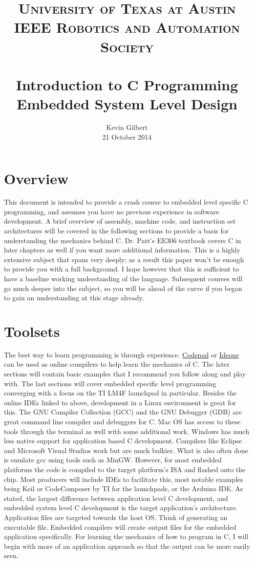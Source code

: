 \documentclass[paper=a4, fontsize=11pt]{scrartcl}
\title{
	\usefont{OT1}{bch}{b}{n}
	\normalfont \normalsize \textsc{University of Texas at Austin\\IEEE Robotics and Automation Society} \\ [25pt]
	\horrule{0.5pt} \\[0.4cm]
	\huge Introduction to C Programming \\ 
		\vskip 0.1in
		\large Embedded System Level Design
	\horrule{2pt} \\[0.5cm]
}
\author{
	\normalfont 			\normalsize
        Kevin Gilbert\\[-3pt]		\normalsize
	21 October 2014
}
\date{}
\numberwithin{equation}{section}		%
\numberwithin{figure}{section}			%
\numberwithin{table}{section}			%
\begin{document}
\maketitle
\section{Overview}
This document is intended to provide a crash course to embedded level specific C programming, and assumes you have no previous experience in software development. A brief overview of assembly, machine code, and instruction set architectures will be covered in the following sections to provide a basis for understanding the mechanics behind C. Dr. Patt's EE306 textbook covers C in later chapters as well if you want more additional information. This is a highly extensive subject that spans very deeply; as a result this paper won't be enough to provide you with a full background. I hope however that this is sufficient to have a baseline working understanding of the language. Subsequent courses will go much deeper into the subject, so you will be ahead of the curve if you began to gain an understanding at this stage already. 

\section{Toolsets}
The best way to learn programming is through experience.
\href{http://codepad.org}{Codepad} or \href{http://ideone.com/}{Ideone} can be used as online compilers to help learn the mechanics of C. The later sections will contain basic examples that I recommend you follow along  and play with. The last sections will cover embedded specific level programming converging with a focus on the TI LM4F launchpad in particular. Besides the online IDEs linked to above, development in a Linux environment is great for this. The GNU Compiler Collection (GCC) and the GNU Debugger (GDB) are great command line compiler and debuggers for C. Mac OS has access to these tools through the terminal as well with some additional work. Windows has much less native support for application based C development. Compilers like Eclipse and Microsoft Visual Studios work but are much bulkier. What is also often done is emulate gcc using tools such as MinGW. However, for most embedded platforms the code is compiled to the target platform's ISA and flashed onto the chip. Most producers will include IDEs to facilitate this, most notable examples being Keil or CodeComposer by TI for the launchpads, or the Arduino IDE. As stated, the largest difference between application level C development, and embedded system level C development is the target application's architecture. Application files are targeted towards the host OS. Think of generating an executable file. Embedded compilers will create output files for the embedded application specifically. For learning the mechanics of how to program in C, I will begin with more of an application approach so that the output can be more easily seen.\\
\end{document}
